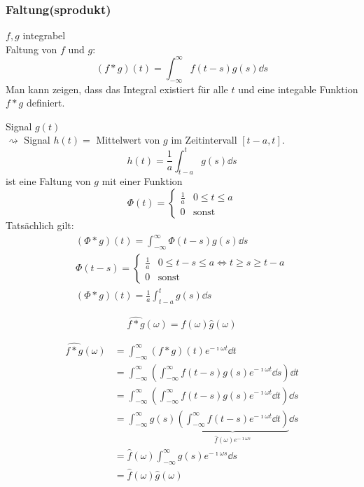 \subsubsection{Faltung(sprodukt)}
$f,g$ integrabel \\
Faltung von $f$ und $g$:
\[ (f*g)(t) = \int_{-\infty}^\infty f(t-s) g(s) \dd s \]
Man kann zeigen, dass das Integral existiert für alle $t$ und eine integable Funktion $f*g$ definiert. \\
\begin{bsp*}
	Signal $g(t)$ \\
	$\rightsquigarrow$ Signal $h(t) =$ Mittelwert von $g$ im Zeitintervall $[t-a,t]$.
	\[ h(t) = \frac{1}{a} \int_{t-a}^t g(s) \dd s \]
	ist eine Faltung von $g$ mit einer Funktion
	\[ \Phi(t) = \begin{cases}
		\frac{1}{a}	& 0 \leq t \leq a	\\
		0		&\text{sonst}	
	\end{cases} \]
	Tatsächlich gilt:
	\begin{gather*}
		(\Phi * g)(t) = \int_{-\infty}^\infty \Phi(t-s) g(s) \dd s \\
		\Phi(t-s) = \begin{cases}
			\frac{1}{a}	& 0 \leq t-s \leq a \iff t \geq s \geq t-a	\\
			0		&\text{sonst}
		\end{cases} \\
		(\Phi * g)(t) = \frac{1}{a} \int_{t-a}^t g(s) \dd s
	\end{gather*}
\end{bsp*}
\begin{satz*}
	\[ \widehat{f*g}(\omega) = \hat{f}(\omega) \hat{g}(\omega) \]
	\begin{bew}
		\[ \begin{split}
			\widehat{f*g}(\omega)	&= \int_{-\infty}^\infty (f*g)(t) e^{-\imath \omega t} \dd t \\
							&= \int_{-\infty}^\infty \left( \int_{-\infty}^\infty f(t-s) g(s) e^{-\imath\omega t} \dd s \right) \dd t \\
							&= \int_{-\infty}^\infty \left( \int_{-\infty}^\infty f(t-s) g(s) e^{-\imath\omega t} \dd t \right) \dd s \\
							&= \int_{-\infty}^\infty g(s) \underbrace{ \left(\int_{-\infty}^\infty f(t-s) e^{-\imath\omega t} \dd t \right) }_{\hat{f}(\omega) e^{-\imath\omega s}}  \dd s \\
							&= \hat{f}(\omega) \int_{-\infty}^\infty g(s) e^{-\imath\omega s} \dd s \\
							&= \hat{f}(\omega) \hat{g}(\omega)
		\end{split} \]
	\end{bew}
\end{satz*}
